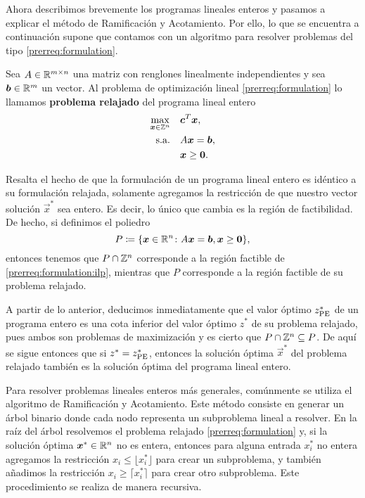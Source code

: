 Ahora describimos brevemente los programas lineales enteros y pasamos a explicar el método de
Ramificación y Acotamiento. Por ello, lo que se encuentra a continuación supone que contamos con un
algoritmo para resolver problemas del tipo \eqref{prerreq:formulation}.
\begin{definition}
	Sea $A \in \mathbb{R}^{m \times n}$ una matriz con renglones linealmente independientes y sea $\boldsymbol{b}
	\in \mathbb{R}^m$ un vector. Al problema de optimización lineal \eqref{prerreq:formulation} lo llamamos
	\textbf{problema relajado} del programa lineal entero
	\begin{subequations}
		\label{prerreq:formulation:ilp}
		\begin{align}
			\max_{\boldsymbol{x} \in \mathbb{Z}^n} \quad
				& \boldsymbol{c}^T\boldsymbol{x}, \label{prerreq:formulation:objective:ilp} \\
			\text{s.a.} \quad
				& A\boldsymbol{x} = \boldsymbol{b}, \label{prerreq:formulation:constraints:ilp} \\
				& \boldsymbol{x} \geq \boldsymbol{0} \nonumber.
		\end{align}
	\end{subequations}
\end{definition}
Resalta el hecho de que la formulación de un programa lineal entero es idéntico a su formulación
relajada, solamente agregamos la restricción de que nuestro vector solución $\vec{x}^*$
sea entero. Es decir, lo único que cambia es la región de factibilidad. De hecho, si
definimos el poliedro
\begin{equation*}
	P \coloneq \lbrace \boldsymbol{x} \in \mathbb{R}^n \colon A\boldsymbol{x} = \boldsymbol{b}, \boldsymbol{x} \geq \boldsymbol{0} \rbrace,
\end{equation*}
entonces tenemos que $P \cap \mathbb{Z}^n$ corresponde a la región factible de
\eqref{prerreq:formulation:ilp}, mientras que $P$ corresponde a la región factible de su problema
relajado.

A partir de lo anterior, deducimos inmediatamente que el valor óptimo $z^*_{\text{PE}}$ de un programa
entero es una cota inferior del valor óptimo $z^*$ de su problema relajado, pues ambos son problemas
de maximización y es cierto que $P \cap \mathbb{Z}^n \subseteq P$. De aquí se sigue entonces que si $z^* =
z^*_{\text{PE}}$, entonces la solución óptima $\vec{x}^*$ del problema relajado también es la solución
óptima del programa lineal entero.

Para resolver problemas lineales enteros más generales, comúnmente se utiliza el algoritmo de
Ramificación y Acotamiento. Este método consiste en generar un árbol binario donde cada nodo
representa un subproblema lineal a resolver. En la raíz del árbol resolvemos el problema relajado
\eqref{prerreq:formulation} y, si la solución óptima $\boldsymbol{x}^* \in \mathbb{R}^n$ no es entera, entonces
para alguna entrada $x_i^*$ no entera agregamos la restricción $x_i \leq \lfloor x_i^* \rfloor$ para
crear un subproblema, y también añadimos la restricción $x_i \geq \lceil x_i^* \rceil$ para crear
otro subproblema. Este procedimiento se realiza de manera recursiva.

